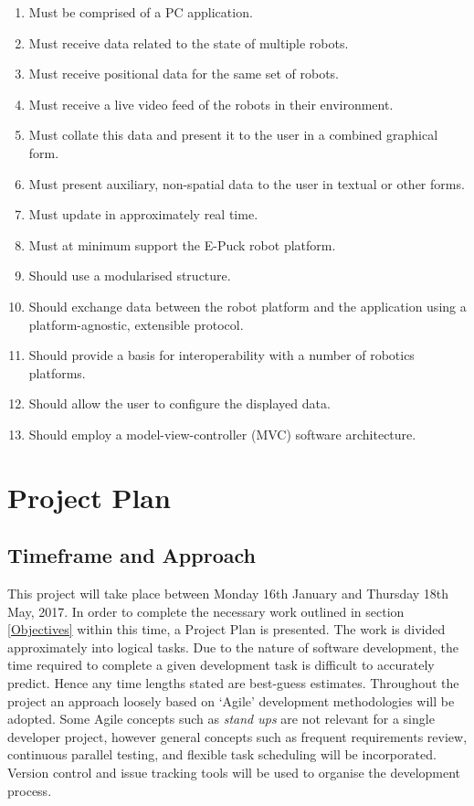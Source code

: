 \documentclass[titlepage,hidelinks,10pt]{article}
\begin{document}
\begin{enumerate}
	\item Must be comprised of a PC application.
	\item Must receive data related to the state of multiple robots.
	\item Must receive positional data for the same set of robots.
	\item Must receive a live video feed of the robots in their environment.
	\item Must collate this data and present it to the user in a combined graphical form.
	\item Must present auxiliary, non-spatial data to the user in textual or other forms.
	\item Must update in approximately real time.
	\item Must at minimum support the E-Puck robot platform.
	\item Should use a modularised structure.
	\item Should exchange data between the robot platform and the application using a platform-agnostic, extensible protocol.
	\item Should provide a basis for interoperability with a number of robotics platforms.
	\item Should allow the user to configure the displayed data.
	\item Should employ a model-view-controller (MVC) software architecture.
\end{enumerate}

\section{Project Plan}
\subsection{Timeframe and Approach}
This project will take place between Monday 16th January and Thursday 18th May, 2017. In order to complete the necessary work outlined in section \ref{Objectives} within this time, a Project Plan is presented. The work is divided approximately into logical tasks.  Due to the nature of software development, the time required to complete a given development task is difficult to accurately predict. Hence any time lengths stated are best-guess estimates. Throughout the project an approach loosely based on `Agile' development methodologies will be adopted\cite{Agile}. Some Agile concepts such as \textit{stand ups} are not relevant for a single developer project, however general concepts such as frequent requirements review, continuous parallel testing, and flexible task scheduling will be incorporated. Version control and issue tracking tools will be used to organise the development process.
\end{document}
